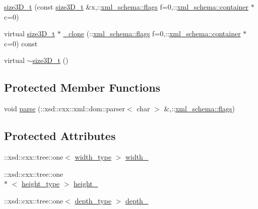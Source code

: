 \begin{DoxyCompactItemize}
\item 
\hyperlink{classsize3D__t_ac5393adac4c8816714a4fbbad067911d}{size3\-D\-\_\-t} (const \hyperlink{classsize3D__t}{size3\-D\-\_\-t} \&x,\-::\hyperlink{namespacexml__schema_a0612287d030cb2732d31a45b258fdc87}{xml\-\_\-schema\-::flags} f=0,\-::\hyperlink{namespacexml__schema_ada9aa30dc722e93ee2ed7243085402a5}{xml\-\_\-schema\-::container} $\ast$c=0)
\item 
virtual \hyperlink{classsize3D__t}{size3\-D\-\_\-t} $\ast$ \hyperlink{classsize3D__t_ada4e1ce7aa535c80b1325f4588ec1844}{\-\_\-clone} (\-::\hyperlink{namespacexml__schema_a0612287d030cb2732d31a45b258fdc87}{xml\-\_\-schema\-::flags} f=0,\-::\hyperlink{namespacexml__schema_ada9aa30dc722e93ee2ed7243085402a5}{xml\-\_\-schema\-::container} $\ast$c=0) const 
\item 
virtual \hyperlink{classsize3D__t_a781511a30f4c1bcd521faab5f8c14c89}{$\sim$size3\-D\-\_\-t} ()
\end{DoxyCompactItemize}
\subsection*{Protected Member Functions}
\begin{DoxyCompactItemize}
\item 
void \hyperlink{classsize3D__t_a61c9c894585f98a117ae18dec35120c7}{parse} (\-::xsd\-::cxx\-::xml\-::dom\-::parser$<$ char $>$ \&,\-::\hyperlink{namespacexml__schema_a0612287d030cb2732d31a45b258fdc87}{xml\-\_\-schema\-::flags})
\end{DoxyCompactItemize}
\subsection*{Protected Attributes}
\begin{DoxyCompactItemize}
\item 
\-::xsd\-::cxx\-::tree\-::one$<$ \hyperlink{classsize3D__t_a7d35a723ccd7d990ae9b91f8d8856a69}{width\-\_\-type} $>$ \hyperlink{classsize3D__t_ac3db384370c18bf31eb74d143c3d8c59}{width\-\_\-}
\item 
\-::xsd\-::cxx\-::tree\-::one\\*
$<$ \hyperlink{classsize3D__t_adc8341bc222084318ef434ea22833f69}{height\-\_\-type} $>$ \hyperlink{classsize3D__t_a33bd3281b2d8ba279f33620da5c43bb3}{height\-\_\-}
\item 
\-::xsd\-::cxx\-::tree\-::one$<$ \hyperlink{classsize3D__t_acc72088c95989e8ecee3fef8118cb91e}{depth\-\_\-type} $>$ \hyperlink{classsize3D__t_a5179c68787cc1fd3f001a602c1d7ea7d}{depth\-\_\-}
\end{DoxyCompactItemize}


